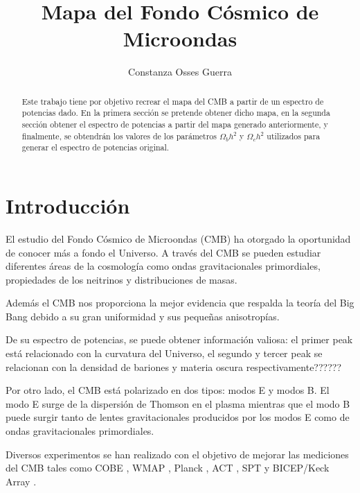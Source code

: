 \documentclass[twocolumn,letterpaper,spanish]{revtex4}
\numberwithin{equation}{section}
\begin{document}
\title{Mapa del Fondo Cósmico de Microondas}
\author{Constanza Osses Guerra}

\begin{abstract}
 Este trabajo tiene por objetivo recrear el mapa del CMB a partir de un espectro de potencias dado. En la primera sección se pretende obtener dicho mapa, en la segunda secci\'on obtener el espectro de potencias a partir del mapa generado anteriormente, y finalmente, se obtendr\'an los valores de los par\'ametros $\Omega_b h^2$ y $\Omega_c h^2$ utilizados para generar el espectro de potencias original.
\end{abstract}


\maketitle
\section{Introducción}

El estudio del Fondo C\'osmico de Microondas (CMB) \cite{cmb} ha otorgado la oportunidad de conocer m\'as a fondo el Universo. A trav\'es del CMB se pueden estudiar diferentes \'areas de la cosmolog\'ia como ondas gravitacionales primordiales, propiedades de los neitrinos y distribuciones de masas.

Adem\'as el CMB nos proporciona la mejor evidencia que respalda la teor\'ia del Big Bang debido a su gran uniformidad y sus peque\~nas anisotrop\'ias. 

De su espectro de potencias, se puede obtener informaci\'on valiosa: el primer peak est\'a relacionado con la curvatura del Universo, el segundo y tercer peak se relacionan con la densidad de bariones y materia oscura respectivamente??????

Por otro lado, el CMB est\'a polarizado en dos tipos: modos E y modos B. El modo E surge de la dispersi\'on de Thomson en el plasma mientras que el modo B puede surgir tanto de lentes gravitacionales producidos por los modos E como de ondas gravitacionales primordiales.

Diversos experimentos se han realizado con el objetivo de mejorar las mediciones del CMB tales como COBE \cite{cobe}, WMAP \cite{wmap}, Planck \cite{planck}, ACT \cite{act}, SPT y BICEP/Keck Array \cite{bicep}.
\end{document}
